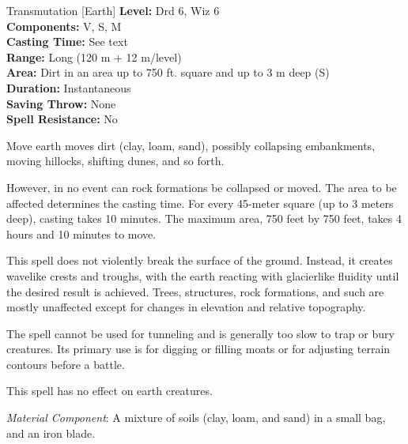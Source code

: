 {Transmutation [Earth]}
{
	\textbf{Level:}
	Drd 6, Wiz 6\\
	\textbf{Components:}
	V, S, M\\
	\textbf{Casting Time:}
	See text\\
	\textbf{Range:}
	Long (120 m + 12 m/level)\\
	\textbf{Area:}
	Dirt in an area up to 750 ft. square and up to 3 m deep (S)\\
	\textbf{Duration:}
	Instantaneous\\
	\textbf{Saving Throw:}
	None\\
	\textbf{Spell Resistance:}
	No\\
}
{
	Move earth moves dirt (clay, loam, sand), possibly collapsing embankments, moving hillocks, shifting dunes, and so forth.

	However, in no event can rock formations be collapsed or moved. The area to be affected determines the casting time. For every 45-meter square (up to 3 meters deep), casting takes 10 minutes. The maximum area, 750 feet by 750 feet, takes 4 hours and 10 minutes to move.

	This spell does not violently break the surface of the ground. Instead, it creates wavelike crests and troughs, with the earth reacting with glacierlike fluidity until the desired result is achieved. Trees, structures, rock formations, and such are mostly unaffected except for changes in elevation and relative topography.

	The spell cannot be used for tunneling and is generally too slow to trap or bury creatures. Its primary use is for digging or filling moats or for adjusting terrain contours before a battle.

	This spell has no effect on earth creatures.

	\textit{Material Component}:
	A mixture of soils (clay, loam, and sand) in a small bag, and an iron blade.

}
